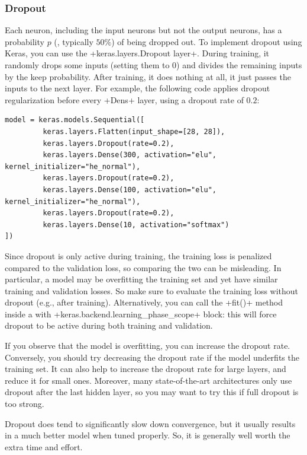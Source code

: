 \subsubsection{Dropout}
Each neuron, including the input neurons but not the output neurons, has a probability $p$ (, typically $50\%$) of being dropped out. To implement dropout using Keras, you can use the \cd+keras.layers.Dropout layer+. During training, it randomly drops some inputs (setting them to $0$) and divides the remaining inputs by the keep probability. After training, it does nothing at all, it just passes the inputs to the next layer. For example, the following code applies dropout regularization before every \cd+Dens+ layer, using a dropout rate of $0.2$:
\begin{lstlisting}
model = keras.models.Sequential([
         keras.layers.Flatten(input_shape=[28, 28]),
         keras.layers.Dropout(rate=0.2),
         keras.layers.Dense(300, activation="elu", kernel_initializer="he_normal"),
         keras.layers.Dropout(rate=0.2),
         keras.layers.Dense(100, activation="elu", kernel_initializer="he_normal"),
         keras.layers.Dropout(rate=0.2),
         keras.layers.Dense(10, activation="softmax")
])
\end{lstlisting}
Since dropout is only active during training, the training loss is penalized compared to the validation loss, so comparing the two can be misleading. In particular, a model may be overfitting the training set and yet have similar training and validation losses. So make sure to evaluate the training loss without dropout (e.g., after training). Alternatively, you can call the \cd+fit()+ method inside a with \cd+keras.backend.learning_phase_scope+ block: this will force dropout to be active during both training and validation.

If you observe that the model is overfitting, you can increase the dropout rate. Conversely, you should try decreasing the dropout rate if the model underfits the training set. It can also help to increase the dropout rate for large layers, and reduce it for small ones. Moreover, many state-of-the-art architectures only use dropout after the last hidden layer, so you may want to try this if full dropout is too strong.

Dropout does tend to significantly slow down convergence, but it usually results in a much better model when tuned properly. So, it is generally well worth the extra time and effort.


